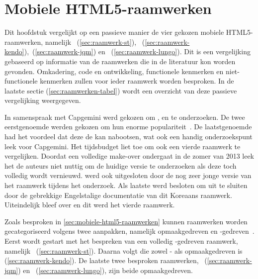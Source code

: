 \chapter{Mobiele HTML5-raamwerken}
\label{chap:raamwerken}

Dit hoofdstuk vergelijkt op een passieve manier de vier gekozen mobiele HTML5-raamwerken, namelijk \st{}~(\ref{sec:raamwerk-st}), \kendo{}~(\ref{sec:raamwerk-kendo}),\jqm{}~(\ref{sec:raamwerk-jqm}) en \lungo{}~(\ref{sec:raamwerk-lungo}).
Dit is een vergelijking gebaseerd op informatie van de raamwerken die in de literatuur kon worden gevonden.
Omkadering, code en ontwikkeling, functionele kenmerken en niet-functionele kenmerken zullen voor ieder raamwerk worden besproken.
In de laatste sectie (\ref{sec:raamwerken-tabel}) wordt een overzicht van deze passieve vergelijking weergegeven.

In samenspraak met Capgemini werd gekozen om \jqm{}, \st{} en \kendo{} te onderzoeken.
De twee eerstgenoemde werden gekozen om hun enorme populariteit~\cite{Firtman2013,Hales2012,Oeflman2011,David2011}.
De laatstgenoemde had het voordeel dat deze de  kan nabootsen, wat ook een handig onderzoekspunt leek voor Capgemini.
Het tijdsbudget liet toe om ook een vierde raamwerk te vergelijken.
Doordat \tmp{} een volledige make-over ondergaat in de zomer van 2013 leek het de auteurs niet nuttig om de huidige versie te onderzoeken als deze toch volledig wordt vernieuwd.
\moobile{} werd ook uitgesloten door de nog zeer jonge versie van het raamwerk tijdens het onderzoek.
Als laatste werd besloten om \davinci{} uit te sluiten door de gebrekkige Engelstalige documentatie van dit Koreaans raamwerk.
Uiteindelijk bleef \lungo{} over en dit werd het vierde raamwerk.

Zoals besproken in \ref{sec:mobiele-html5-raamwerken} kunnen raamwerken worden gecategoriseerd volgens twee aanpakken, namelijk opmaakgedreven en \js{}-gedreven~\cite{Oeflman2011}. 
Eerst wordt gestart met het bespreken van een volledig \js{}-gedreven raamwerk, namelijk \st{}~(\ref{sec:raamwerk-st}).
Daarna volgt \kendo{} die zowel \js{}- als opmaakgedreven is (\ref{sec:raamwerk-kendo}).
De laatste twee besproken raamwerken, \jqm{}~(\ref{sec:raamwerk-jqm}) en \lungo{}~(\ref{sec:raamwerk-lungo}), zijn beide opmaakgedreven.


